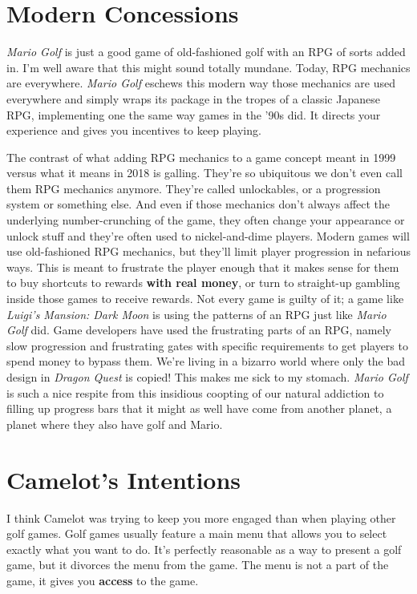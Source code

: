 \documentclass{book}
\begin{document}
\FloatBarrier\needspace{10mm}\section*{Modern Concessions}\nopagebreak[4]

\emph{Mario Golf} is just a good game of old-fashioned golf with an RPG of sorts added in. I’m well aware that this might sound totally mundane. Today, RPG mechanics are everywhere. \emph{Mario Golf} eschews this modern way those mechanics are used everywhere and simply wraps its package in the tropes of a classic Japanese RPG, implementing one the same way games in the ’90s did. It directs your experience and gives you incentives to keep playing.

The contrast of what adding RPG mechanics to a game concept meant in 1999 versus what it means in 2018 is galling. They’re so ubiquitous we don’t even call them RPG mechanics anymore. They’re called unlockables, or a progression system or something else. And even if those mechanics don’t always affect the underlying number-crunching of the game, they often change your appearance or unlock stuff and they’re often used to nickel-and-dime players. Modern games will use old-fashioned RPG mechanics, but they’ll limit player progression in nefarious ways. This is meant to frustrate the player enough that it makes sense for them to buy shortcuts to rewards \textbf{with real money}, or turn to straight-up gambling inside those games to receive rewards. Not every game is guilty of it; a game like \emph{Luigi’s Mansion: Dark Moon} is using the patterns of an RPG just like \emph{Mario Golf} did. Game developers have used the frustrating parts of an RPG, namely slow progression and frustrating gates with specific requirements to get players to spend money to bypass them. We’re living in a bizarro world where only the bad design in \emph{Dragon Quest} is copied! This makes me sick to my stomach. \emph{Mario Golf} is such a nice respite from this insidious coopting of our natural addiction to filling up progress bars that it might as well have come from another planet, a planet where they also have golf and Mario.

\FloatBarrier\needspace{10mm}\section*{Camelot’s Intentions}\nopagebreak[4]

I think Camelot was trying to keep you more engaged than when playing other golf games. Golf games usually feature a main menu that allows you to select exactly what you want to do. It’s perfectly reasonable as a way to present a golf game, but it divorces the menu from the game. The menu is not a part of the game, it gives you \textbf{access} to the game.
\end{document}
